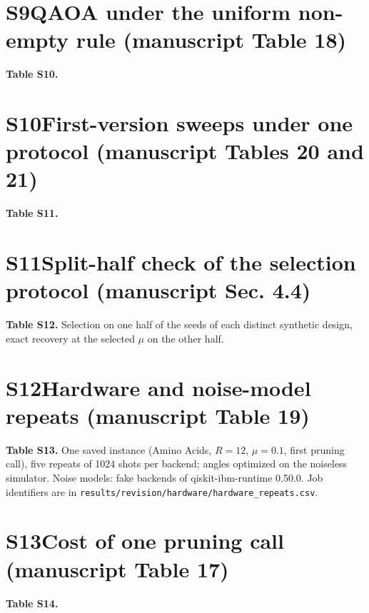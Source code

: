 \documentclass[10pt]{article}
\newcommand{\T}[1]{}
\begin{document}
\section*{S9\quad QAOA under the uniform non-empty rule (manuscript Table 18)}
\textbf{Table S10.}
{\small\setlength{\tabcolsep}{4pt}\T{tableR2-6_qaoa_noise.tex}}

\section*{S10\quad First-version sweeps under one protocol (manuscript Tables 20 and 21)}
\textbf{Table S11.}
\T{tableR4-1_sweeps.tex}

\section*{S11\quad Split-half check of the selection protocol (manuscript Sec. 4.4)}
\textbf{Table S12.} Selection on one half of the seeds of each distinct synthetic design, exact recovery at the
selected \(\mu\) on the other half.
\T{tableS_heldout.tex}

\section*{S12\quad Hardware and noise-model repeats (manuscript Table 19)}
\textbf{Table S13.} One saved instance (Amino Acids, \(R=12\), \(\mu=0.1\), first pruning call), five repeats of 1024
shots per backend; angles optimized on the noiseless simulator. Noise models: fake backends of qiskit-ibm-runtime
0.50.0. Job identifiers are in \texttt{results/revision/hardware/hardware\_repeats.csv}.

\smallskip
{\footnotesize\setlength{\tabcolsep}{4pt}\T{tableS_hardware.tex}}

\section*{S13\quad Cost of one pruning call (manuscript Table 17)}
\textbf{Table S14.}
\T{tableR4-5_runtime.tex}
\end{document}
